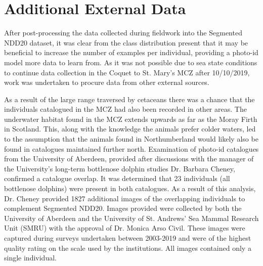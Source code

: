 \section{Additional External Data}\label{ch:NDD,sec:NDD_AU_SMRU}

After post-processing the data collected during fieldwork into the Segmented NDD20 dataset, it was clear from the class distribution present that it may be beneficial to increase the number of examples per individual, providing a photo-id model more data to learn from. As it was not possible due to sea state conditions to continue data collection in the Coquet to St. Mary's MCZ after 10/10/2019, work was undertaken to procure data from other external sources. 

As a result of the large range traversed by cetaceans \cite{shane_ecology_1986} there was a chance that the individuals catalogued in the MCZ had also been recorded in other areas. The underwater habitat found in the MCZ extends upwards as far as the Moray Firth in Scotland. This, along with the knowledge the animals prefer colder waters, led to the assumption that the animals found in Northumberland would likely also be found in catalogues maintained further north. Examination of photo-id catalogues from the University of Aberdeen, provided after discussions with the manager of the University's long-term bottlenose dolphin studies Dr. Barbara Cheney, confirmed a catalogue overlap. It was determined that 23 individuals (all bottlenose dolphins) were present in both catalogues. As a result of this analysis, Dr. Cheney provided 1827 additional images of the overlapping individuals to complement Segmented NDD20. Images provided were collected by both the University of Aberdeen and the University of St. Andrews' Sea Mammal Research Unit (SMRU) with the approval of Dr. Monica Arso Civil. These images were captured during surveys undertaken between 2003-2019 and were of the highest quality rating on the scale used by the institutions. All images contained only a single individual. 

